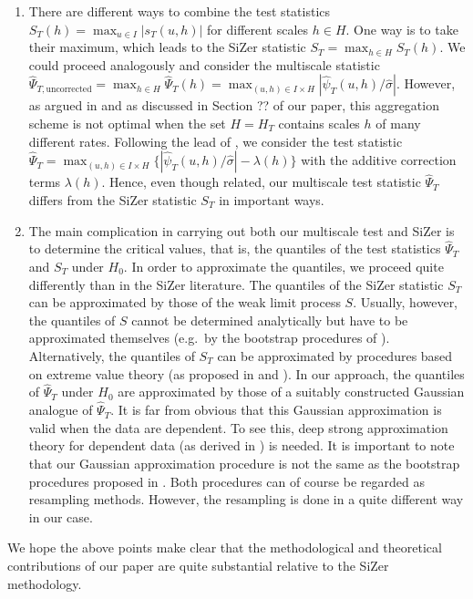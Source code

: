 \documentclass[a4paper,12pt]{article}
\begin{document}
\begin{enumerate}[label=(\roman*), leftmargin=0.8cm]
\item There are different ways to combine the test statistics $S_T(h) = \max_{u \in I} |s_T(u,h)|$ for different scales $h \in H$. One way is to take their maximum, which leads to the SiZer statistic $S_T = \max_{h \in H} S_T(h)$. We could proceed analogously and consider the multiscale statistic $\widehat{\Psi}_{T,\text{uncorrected}} = \max_{h \in H} \widehat{\Psi}_T(h) = \max_{(u,h) \in I \times H} |\widehat{\psi}_T(u,h)/\widehat{\sigma}|$. However, as argued in \cite{DuembgenSpokoiny2001} and as discussed in Section ?? of our paper, this aggregation scheme is not optimal when the set $H = H_T$ contains scales $h$ of many different rates. Following the lead of \cite{DuembgenSpokoiny2001}, we consider the test statistic $\widehat{\Psi}_T = \max_{(u,h) \in I \times H} \{ |\widehat{\psi}_T(u,h)/\widehat{\sigma}| - \lambda(h) \}$ with the additive correction terms $\lambda(h)$. Hence, even though related, our multiscale test statistic $\widehat{\Psi}_T$ differs from the SiZer statistic $S_T$ in important ways. 

\item The main complication in carrying out both our multiscale test and SiZer is to determine the critical values, that is, the quantiles of the test statistics $\widehat{\Psi}_T$ and $S_T$ under $H_0$. In order to approximate the quantiles, we proceed quite differently than in the SiZer literature. The quantiles of the SiZer statistic $S_T$ can be approximated by those of the weak limit process $S$. Usually, however, the quantiles of $S$ cannot be determined analytically but have to be approximated themselves (e.g.\ by the bootstrap procedures of \cite{ChaudhuriMarron1999, ChaudhuriMarron2000}). Alternatively, the quantiles of $S_T$ can be approximated by procedures based on extreme value theory (as proposed in \cite{HannigMarron2006} and \cite{ParkHannigKang2009}). In our approach, the quantiles of $\widehat{\Psi}_T$ under $H_0$ are approximated by those of a suitably constructed Gaussian analogue of $\widehat{\Psi}_T$. It is far from obvious that this Gaussian approximation is valid when the data are dependent. To see this, deep strong approximation theory for dependent data (as derived in \cite{BerkesLiuWu2014}) is needed. It is important to note that our Gaussian approximation procedure is not the same as the bootstrap procedures proposed in \cite{ChaudhuriMarron1999, ChaudhuriMarron2000}. Both procedures can of course be regarded as resampling methods. However, the resampling is done in a quite different way in our case.

\end{enumerate}
We hope the above points make clear that the methodological and theoretical contributions of our paper are quite substantial relative to the SiZer methodology. 
\vspace{10pt}
\end{document}
